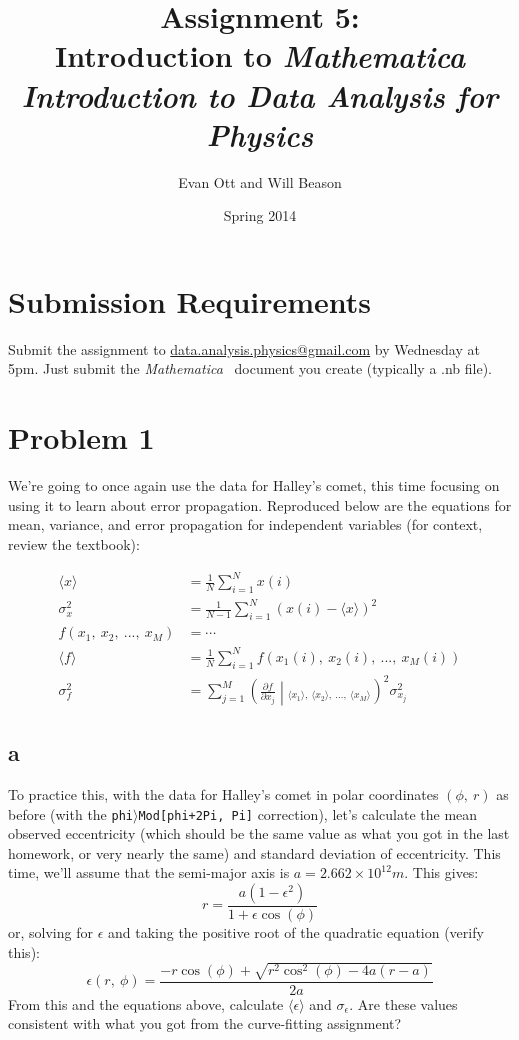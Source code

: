 \documentclass{article}
\title{Assignment 5: \\ Introduction to \emph{Mathematica}\\
\large \emph{Introduction to Data Analysis for Physics}}
\author{Evan Ott and Will Beason}
\date{Spring 2014}
\newcommand{\M}[0]{\emph{Mathematica}~}
\begin{document}
\maketitle
\section{Submission Requirements}
Submit the assignment to \href{mailto:data.analysis.physics@gmail.com}{data.analysis.physics@gmail.com} by Wednesday at 5pm. Just submit the \M
document you create (typically a .nb file).

\section{Problem 1}
We're going to once again use the data for Halley's comet, this time focusing on using it to learn about error propagation. Reproduced below are the
equations for mean, variance, and error propagation for independent variables (for context, review the textbook):

\begin{align*}
\langle x\rangle&=\frac{1}{N}\sum_{i=1}^Nx(i)\\
\sigma_x^2&=\frac{1}{N-1}\sum_{i=1}^N(x(i)-\langle x\rangle)^2\\
f(x_1,~x_2,~...,~x_M)&=\cdots\\
\langle f\rangle&=\frac{1}{N}\sum_{i=1}^Nf(x_1(i),~x_2(i),~...,~x_M(i))\\
\sigma_f^2&=\sum_{j=1}^M\left(\frac{\partial f}{\partial x_j}\middle|_{\langle x_1\rangle,~\langle x_2\rangle,~...,~\langle x_M\rangle}\right)^2\sigma_{x_j}^2
\end{align*}

\subsection{a}
To practice this, with the data for Halley's comet in polar coordinates $(\phi,~r)$ as before (with the \texttt{phi}$\rangle$\texttt{Mod[phi+2Pi, Pi]} correction), let's calculate
the mean observed eccentricity (which should be the same value as what you got in the last homework, or very nearly the same) and standard deviation of eccentricity. This time,
we'll assume that the semi-major axis is $a=2.662\times10^{12}m$. This gives:
$$r=\frac{a(1-\epsilon^2)}{1+\epsilon\cos(\phi)}$$
or, solving for $\epsilon$ and taking the positive root of the quadratic equation (verify this):
$$\epsilon(r,~\phi)=\frac{-r\cos(\phi)+\sqrt{r^2\cos^2(\phi)-4a(r-a)}}{2a}$$
From this and the equations above, calculate $\langle\epsilon\rangle$ and $\sigma_\epsilon$. Are these values consistent with what you got from the curve-fitting assignment?
\end{document}
